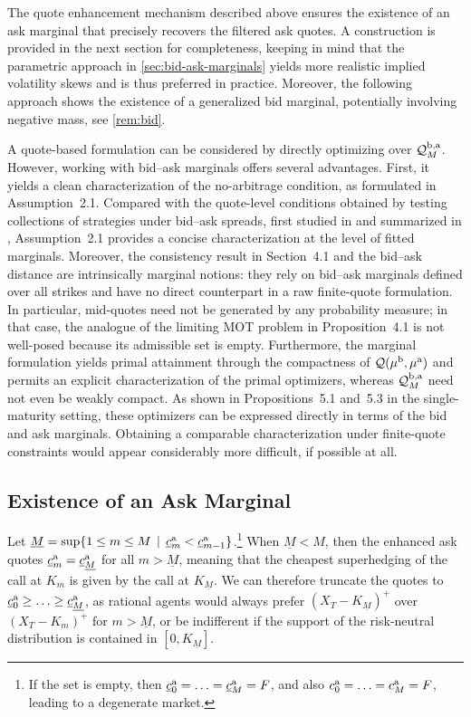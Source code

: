 \documentclass[11pt]{article}
\newcommand{\cQ}{\mathcal{Q}}
\theoremstyle{plain}
\theoremstyle{definition}
\theoremstyle{remark}
\theoremstyle{plain}
\begin{document}
The quote enhancement mechanism described above ensures the existence of an ask marginal that precisely recovers the filtered ask quotes. A construction is provided in the next section for  completeness, keeping in mind that the parametric approach  in \cref{sec:bid-ask-marginals} yields more realistic implied volatility skews and is thus preferred in practice. Moreover, the following approach shows the existence of a generalized bid marginal, potentially involving negative mass, see \cref{rem:bid}.   %

A  quote-based formulation can be considered by directly optimizing over $\cQ_M^{\rm b,a}$. However, working with bid--ask marginals offers several advantages. First, it yields a clean characterization of the no-arbitrage condition, as formulated in Assumption~2.1. Compared with the quote-level conditions obtained by testing collections of strategies under bid--ask spreads, first studied in \cite{Cousot2007} and summarized in \cite[Table~1]{CohenReisingerWang2020}, Assumption~2.1 provides a concise characterization at the level of fitted marginals. Moreover, the consistency result in Section~4.1 and the bid--ask distance are intrinsically marginal notions: they rely on bid--ask marginals defined over all strikes and have no direct counterpart in a raw finite-quote formulation. In particular, mid-quotes need not be generated by any probability measure; in that case, the analogue of the limiting MOT problem in Proposition~4.1 is not well-posed because its admissible set is empty. Furthermore, the marginal formulation yields primal attainment through the compactness of $\cQ(\mu^{\rm b}, \mu^{\rm a})$ and permits an explicit characterization of the primal optimizers, whereas $\cQ_M^{\rm b,a}$ need not even be weakly compact. As shown in Propositions~5.1 and~5.3 in the single-maturity setting, these optimizers can be expressed directly in terms of the bid and ask marginals. Obtaining a comparable characterization under finite-quote constraints would appear considerably more difficult, if possible at all.


\subsection{Existence of an  Ask Marginal} \label{sec:existenceAsk}

Let $\underline{M} = \sup\{1\leq m \le  M \, \mid \, \underline{c}_{m}^{\rm a}  < \underline{c}_{m-1}^{\rm a}  \}$.\footnote{If the set is empty, then $\underline{c}_0^{\rm a} = \ldots = \underline{c}_M^{\rm a} = F$, and also $c_0^{\rm a} = \ldots = c_M^{\rm a} = F$, leading to a degenerate market.} When $\underline{M}<M$, then the enhanced ask quotes $\underline{c}_{m}^{\rm a}  =\underline{c}_{\underline{M}}^{\rm a}$ for all $m>\underline{M}$, meaning that the cheapest superhedging of the call at $K_m$ is given by the call at $K_{\underline{M}}$. We can therefore truncate the quotes to $ \underline{c}^{\rm a}_0 \ge \ldots \ge \underline{c}^{\rm a}_{\underline{M}}$, as rational agents would always prefer $(X_T - K_{\underline{M}})^+$ over $(X_T - K_m)^+$ for $m>\underline{M}$, or be indifferent if the support of the  risk-neutral distribution is contained in $[0,K_{\underline{M}}]$. 
\end{document}

